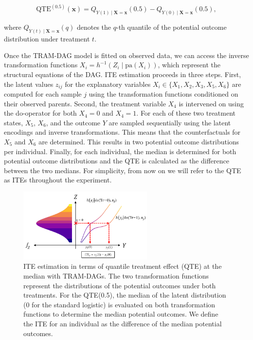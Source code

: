 \begin{equation}
\text{QTE}^{(0.5)}(\mathbf{x}) = Q_{Y(1) \mid \mathbf{X} = \mathbf{x}}(0.5) - Q_{Y(0) \mid \mathbf{X} = \mathbf{x}}(0.5),
\end{equation}


where $Q_{Y(t) \mid \mathbf{X} = \mathbf{x}}(q)$ denotes the $q$-th quantile of the potential outcome distribution under treatment $t$.

Once the TRAM-DAG model is fitted on observed data, we can access the inverse transformation functions $X_i = h^{-1}(Z_i \mid \text{pa}(X_i))$, which represent the structural equations of the DAG. ITE estimation proceeds in three steps. First, the latent values $z_{ij}$ for the explanatory variables $X_i \in \{X_1, X_2, X_3, X_5, X_6\}$ are computed for each sample $j$ using the transformation functions conditioned on their observed parents. Second, the treatment variable $X_4$ is intervened on using the do-operator for both $X_4 = 0$ and $X_4 = 1$. For each of these two treatment states, $X_5$, $X_6$, and the outcome $Y$ are sampled sequentially using the latent encodings and inverse transformations. This means that the counterfactuals for $X_5$ and $X_6$ are determined. This results in two potential outcome distributions per individual. Finally, for each individual, the median is determined for both potential outcome distributions and the QTE is calculated as the difference between the two medians. For simplicity, from now on we will refer to the QTE as ITEs throughout the experiment. 


\begin{figure}[H]
\centering
\includegraphics[width=0.6\textwidth]{img/potential_outcomes_y.png}
\caption{ITE estimation in terms of quantile treatment effect (QTE) at the median with TRAM-DAGs. The two transformation functions represent the distributions of the potential outcomes under both treatments. For the QTE(0.5), the median of the latent distribution (0 for the standard logistic) is evaluated on both transformation functions to determine the median potential outcomes. We define the ITE for an individual as the difference of the median potential outcomes.}
\label{fig:exp4_potential_outcomes}
\end{figure}


